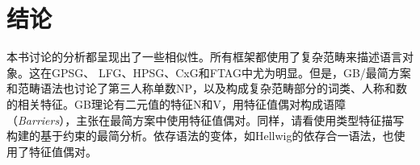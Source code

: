 \chapter{结论}

本书讨论的分析都呈现出了一些相似性。所有框架都使用了复杂范畴来描述语言对象。这在GPSG\indexgpsgc、
LFG\indexlfgc、HPSG\indexhpsgc、CxG\indexcxgc 和FTAG\indextagc 中尤为明显。但是，GB/最简方案和范畴语法也讨论了第三人称单数NP，以及构成复杂范畴部分的词类、人称和数的相关特征。GB理论有二元值的特征N和V\citep[]{Chomsky70a}，\citet[]{Stabler92a-u}用特征值偶对构成语障（\emph{Barriers}），\citet[--291]{SE2002a}主张在最简方案\indexmpc 中使用特征值偶对。同样，请看\citet[\page]{Veenstra98a}使用类型特征描写构建的基于约束的最简分析。依存语法的变体，如Hellwig的依存合一语法，也使用了特征值偶对\citep[]{Hellwig2003a}。


